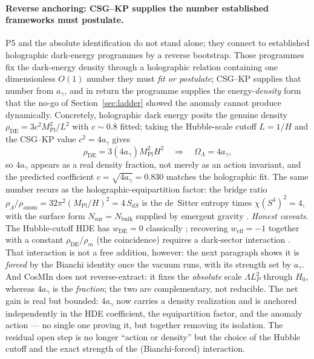 \documentclass[11pt,a4paper]{article}
\theoremstyle{plain}
\theoremstyle{definition}
\theoremstyle{remark}
\newcommand{\OL}{\Omega_\Lambda}
\newcommand{\ag}{a_\gamma}
\newcommand{\Mpl}{M_{\mathrm{Pl}}}
\begin{document}
\paragraph{Reverse anchoring: CSG--KP supplies the number established frameworks must postulate.}
P5 and the absolute identification do not stand alone; they connect to established holographic
dark-energy programmes by a reverse bootstrap. Those programmes fix the dark-energy density
through a holographic relation containing one dimensionless $O(1)$ number they must \emph{fit or
postulate}; CSG--KP supplies that number from $\ag$, and in return the programme supplies the
energy-\emph{density} form that the no-go of Section~\ref{sec:ladder} showed the anomaly cannot
produce dynamically. Concretely, holographic dark energy \cite{CohenKaplanNelson1999,Li2004}
posits the genuine density $\rho_{\mathrm{DE}} = 3c^2\Mpl^2/L^2$ with $c\sim0.8$ fitted; taking the
Hubble-scale cutoff $L=1/H$ and the CSG--KP value $c^2 = 4\ag$ gives
\begin{equation}
\rho_{\mathrm{DE}} = 3(4\ag)\Mpl^2 H^2 \quad\Longrightarrow\quad \OL = 4\ag ,
\end{equation}
so $4\ag$ appears as a real density fraction, not merely as an action invariant, and the
predicted coefficient $c=\sqrt{4\ag}=0.830$ matches the holographic fit. The same number recurs as
the holographic-equipartition factor: the bridge ratio $\rho_\Lambda/\rho_{\mathrm{anom}} =
32\pi^2(\Mpl/H)^2 = 4\,S_{dS}$ is the de~Sitter entropy times $\chi(S^4)^2=4$, with the surface
form $N_{\mathrm{sur}}=N_{\mathrm{bulk}}$ supplied by emergent gravity \cite{PadmanabhanCosMIn2013}.
\emph{Honest caveats.} The Hubble-cutoff HDE has $w_{\mathrm{DE}}=0$ classically \cite{Hsu2004};
recovering $w_{\mathrm{eff}}=-1$ together with a constant $\rho_{\mathrm{DE}}/\rho_m$ (the
coincidence) requires a dark-sector interaction \cite{PavonZimdahl2005}. That interaction is not a
free addition, however: the next paragraph shows it is \emph{forced} by the Bianchi identity once
the vacuum runs, with its strength set by $\ag$. And CosMIn \cite{PadmanabhanCosMIn2013} does not
reverse-extract: it fixes the \emph{absolute} scale $\Lambda L_P^2$ through $H_0$, whereas $4\ag$ is
the \emph{fraction}; the two are complementary, not reducible. The net gain is real but bounded:
$4\ag$ now carries a density realization and is anchored independently in the HDE coefficient, the
equipartition factor, and the anomaly action --- no single one proving it, but together removing
its isolation. The residual open step is no longer ``action or density'' but the choice of the
Hubble cutoff and the exact strength of the (Bianchi-forced) interaction.
\end{document}
